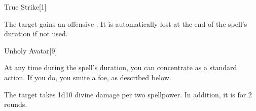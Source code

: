 \begin{spellsection}{True Strike}[1]
    \begin{spellheader}
    \end{spellheader}
    \begin{spellcontent}
        \begin{spelltargetinginfo}
        \end{spelltargetinginfo}
        \begin{spelleffects}
            \spelleffect The target gains an offensive . It is automatically lost at the end of the spell's duration if not used.
            \spelldur \durshort
        \end{spelleffects}
    \end{spellcontent}
    \begin{spellfooter}
        \miscastrandom
    \end{spellfooter}
    \begin{spellaugments}
    \end{spellaugments}
\end{spellsection}


\begin{spellsection}{Unholy Avatar}[9]
    \begin{spellheader}
    \end{spellheader}
    \begin{spellcontent}
        \begin{spelltargetinginfo}
        \end{spelltargetinginfo}
        \begin{spelleffects}
            \spelleffect At any time during the spell's duration, you can concentrate as a standard action. If you do, you smite a foe, as described below.
            \spelldur \durlong
        \end{spelleffects}
    \end{spellcontent}
    \begin{spellsubcontent}
        \begin{spelltargetinginfo}
        \end{spelltargetinginfo}
        \begin{spelleffects}
            \spelleffect The target takes 1d10 divine damage per two spellpower. In addition, it is \staggered for 2 rounds.
        \end{spelleffects}
    \end{spellsubcontent}
    \begin{spellfooter}
        \miscastexplode
    \end{spellfooter}
\end{spellsection}

